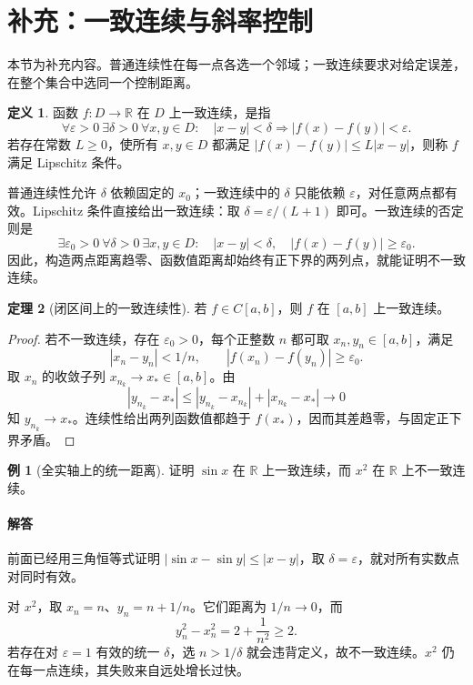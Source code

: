 \documentclass[UTF8,fontset=fandol,12pt,oneside,openany]{ctexrep}
\newcommand{\R}{\mathbb R}
\theoremstyle{definition}
\newtheorem{theorem}{定理}[chapter]
\newtheorem{definition}[theorem]{定义}
\newtheorem{example}{例}[chapter]
\begin{document}
\section{补充：一致连续与斜率控制}
\label{lec:04:uniform}

本节为补充内容。普通连续性在每一点各选一个邻域；一致连续要求对给定误差，在整个集合中选同一个控制距离。

\begin{definition}
函数 $f:D\to\R$ 在 $D$ 上一致连续，是指
\[
 \forall\varepsilon>0\ \exists\delta>0\ \forall x,y\in D:
 \quad |x-y|<\delta\Longrightarrow |f(x)-f(y)|<\varepsilon.
\]
若存在常数 $L\ge0$，使所有 $x,y\in D$ 都满足 $|f(x)-f(y)|\le L|x-y|$，则称 $f$ 满足 Lipschitz 条件。
\end{definition}

普通连续性允许 $\delta$ 依赖固定的 $x_0$；一致连续中的 $\delta$ 只能依赖 $\varepsilon$，对任意两点都有效。Lipschitz 条件直接给出一致连续：取 $\delta=\varepsilon/(L+1)$ 即可。一致连续的否定则是
\[
 \exists\varepsilon_0>0\ \forall\delta>0\ \exists x,y\in D:
 \quad |x-y|<\delta,\quad |f(x)-f(y)|\ge\varepsilon_0.
\]
因此，构造两点距离趋零、函数值距离却始终有正下界的两列点，就能证明不一致连续。

\begin{theorem}[闭区间上的一致连续性]
若 $f\in C[a,b]$，则 $f$ 在 $[a,b]$ 上一致连续。
\end{theorem}
\begin{proof}
若不一致连续，存在 $\varepsilon_0>0$，每个正整数 $n$ 都可取 $x_n,y_n\in[a,b]$，满足
\[
 |x_n-y_n|<1/n,\qquad |f(x_n)-f(y_n)|\ge\varepsilon_0.
\]
取 $x_n$ 的收敛子列 $x_{n_k}\to x_*\in[a,b]$。由
\[
 |y_{n_k}-x_*|\le |y_{n_k}-x_{n_k}|+|x_{n_k}-x_*|\to0
\]
知 $y_{n_k}\to x_*$。连续性给出两列函数值都趋于 $f(x_*)$，因而其差趋零，与固定正下界矛盾。
\end{proof}

\begin{example}[全实轴上的统一距离]
证明 $\sin x$ 在 $\R$ 上一致连续，而 $x^2$ 在 $\R$ 上不一致连续。
\end{example}
\paragraph{解答}
前面已经用三角恒等式证明 $|\sin x-\sin y|\le |x-y|$，取 $\delta=\varepsilon$，就对所有实数点对同时有效。

对 $x^2$，取 $x_n=n$、$y_n=n+1/n$。它们距离为 $1/n\to0$，而
\[
 y_n^2-x_n^2=2+\frac1{n^2}\ge2.
\]
若存在对 $\varepsilon=1$ 有效的统一 $\delta$，选 $n>1/\delta$ 就会违背定义，故不一致连续。$x^2$ 仍在每一点连续，其失败来自远处增长过快。
\end{document}
